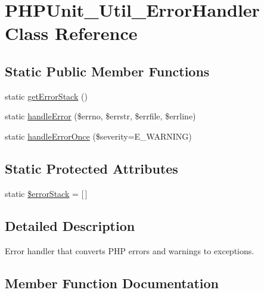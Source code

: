 \hypertarget{class_p_h_p_unit___util___error_handler}{}\section{P\+H\+P\+Unit\+\_\+\+Util\+\_\+\+Error\+Handler Class Reference}
\label{class_p_h_p_unit___util___error_handler}
\subsection*{Static Public Member Functions}
\begin{DoxyCompactItemize}
\item 
static \mbox{\hyperlink{class_p_h_p_unit___util___error_handler_a51bd8b56b164c04af2c9fac7a2b7f71b}{get\+Error\+Stack}} ()
\item 
static \mbox{\hyperlink{class_p_h_p_unit___util___error_handler_a84f0a108d579fb2b6214ac165ba43f49}{handle\+Error}} (\$errno, \$errstr, \$errfile, \$errline)
\item 
static \mbox{\hyperlink{class_p_h_p_unit___util___error_handler_a544bf731d5ec4ff76db4bab47cc767df}{handle\+Error\+Once}} (\$severity=E\+\_\+\+W\+A\+R\+N\+I\+NG)
\end{DoxyCompactItemize}
\subsection*{Static Protected Attributes}
\begin{DoxyCompactItemize}
\item 
static \mbox{\hyperlink{class_p_h_p_unit___util___error_handler_ada0bac2f96f0f9e4bd927a90c01f1132}{\$error\+Stack}} = \mbox{[}$\,$\mbox{]}
\end{DoxyCompactItemize}


\subsection{Detailed Description}
Error handler that converts P\+HP errors and warnings to exceptions. 

\subsection{Member Function Documentation}
\mbox{\label{class_p_h_p_unit___util___error_handler_a51bd8b56b164c04af2c9fac7a2b7f71b}} 
